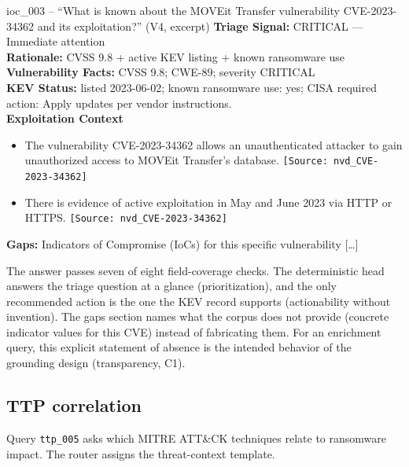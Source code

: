 \begin{responsebox}{ioc\_003 -- ``What is known about the MOVEit
Transfer vulnerability CVE-2023-34362 and its exploitation?'' (V4,
excerpt)}
\textbf{Triage Signal:} CRITICAL --- Immediate attention\\
\textbf{Rationale:} CVSS 9.8 + active KEV listing + known ransomware use\\
\textbf{Vulnerability Facts:} CVSS 9.8; CWE-89; severity CRITICAL\\
\textbf{KEV Status:} listed 2023-06-02; known ransomware use: yes;
CISA required action: Apply updates per vendor instructions.\\[4pt]
\textbf{Exploitation Context}
\begin{itemize}
    \item The vulnerability CVE-2023-34362 allows an unauthenticated
          attacker to gain unauthorized access to MOVEit Transfer's
          database. \texttt{[Source: nvd\_CVE-2023-34362]}
    \item There is evidence of active exploitation in May and June 2023
          via HTTP or HTTPS. \texttt{[Source: nvd\_CVE-2023-34362]}
\end{itemize}
\textbf{Gaps:} Indicators of Compromise (IoCs) for this specific
vulnerability [\dots]
\end{responsebox}

The answer passes seven of eight field-coverage checks. The
deterministic head answers the triage question at a glance
(prioritization), and the only recommended action is the one the KEV
record supports (actionability without invention). The gaps section
names what the corpus does not provide (concrete indicator values for
this CVE) instead of fabricating them. For an enrichment query, this
explicit statement of absence is the intended behavior of the grounding
design (transparency, C1).

\subsection{TTP correlation}
\label{sec:scenario-ttp}

Query \texttt{ttp\_005} asks which MITRE ATT\&CK techniques relate to
ransomware impact. The router assigns the threat-context template.

